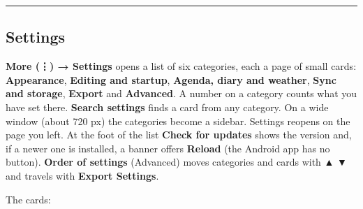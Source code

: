 \documentclass[11pt]{article}
\begin{document}
\noindent\rule{\textwidth}{0.5pt}

\subsection{Settings}
\label{sec:org788d206}
\textbf{More (⋮) → Settings} opens a list of six categories, each a page of small cards: \textbf{Appearance}, \textbf{Editing and startup}, \textbf{Agenda, diary and weather}, \textbf{Sync and storage}, \textbf{Export} and \textbf{Advanced}. A number on a category counts what you have set there. \textbf{Search settings} finds a card from any category. On a wide window (about 720 px) the categories become a sidebar. Settings reopens on the page you left. At the foot of the list \textbf{Check for updates} shows the version and, if a newer one is installed, a banner offers \textbf{Reload} (the Android app has no button). \textbf{Order of settings} (Advanced) moves categories and cards with ▲ ▼ and travels with \textbf{Export Settings}.

The cards:
\end{document}
